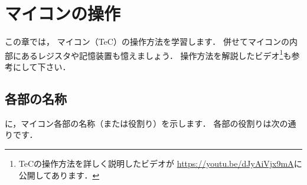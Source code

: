 \chapter{マイコンの操作\label{sousa}}
この章では，
マイコン（TeC）の操作方法を学習します．
併せてマイコンの内部にあるレジスタや記憶装置も憶えましょう．
操作方法を解説したビデオ\footnote{
  \begin{minipage}[t]{0.9\columnwidth}
    \begin{minipage}{0.75\columnwidth}
      TeCの操作方法を詳しく説明したビデオが
      \url{https://youtu.be/dJyAiVjx9mA}に公開してあります．
    \end{minipage}\hfill
    \begin{minipage}{0.2\columnwidth}
    \end{minipage}
  \end{minipage}
}も参考にして下さい．

\section{各部の名称}
に，マイコン各部の名称（または役割り）を示します．
各部の役割りは次の通りです．


